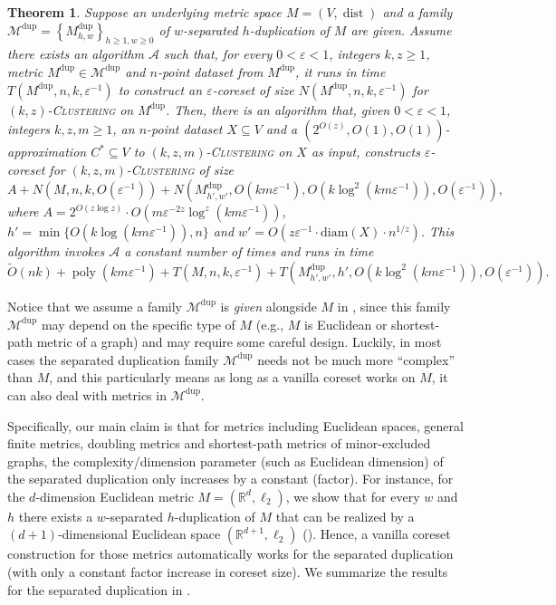 \documentclass[letterpaper,11pt]{article}
\theoremstyle{plain}
\newtheorem{theorem}{Theorem}[section]
\theoremstyle{definition}
\theoremstyle{remark}
\DeclareMathOperator{\poly}{poly}
\DeclareMathOperator{\dist}{dist}
\newcommand{\diam}{\mathrm{diam}}
\newcommand{\dup}{\mathrm{dup}}
\newcommand{\eps}{\varepsilon}
\newcommand{\calA}{\mathcal{A}}
\newcommand{\calM}{\mathcal{M}}
\newcommand{\ProblemName}[1]{\textsc{#1}}
\newcommand{\kzC}{\ProblemName{$(k,z)$-Clustering}\xspace}
\newcommand{\kzmC}{\ProblemName{$(k,z,m)$-Clustering}\xspace}
\begin{document}
\begin{theorem}
    \label{thm:reduction2}
    Suppose an underlying metric space $M=(V,\dist)$ and a family $\calM^\dup=\left\{M_{h,w}^\dup\right\}_{h\ge 1,w\ge 0}$ of $w$-separated $h$-duplication of $M$ are given. 
Assume there exists an algorithm $\calA$ such that, for every $0<\eps<1$, integers $k,z\ge 1$, metric $M^\dup\in\calM^\dup$ and  $n$-point dataset from $M^\dup$, it runs in time $T(M^\dup, n, k, \eps^{-1})$ to construct an $\eps$-coreset of size $N(M^\dup, n, k, \eps^{-1})$ for \kzC on $M^\dup$.
Then, there is an algorithm that, given $0<\eps<1$, integers $k,z,m\ge 1$, an $n$-point dataset $X\subseteq V$
    and a $(2^{O(z)},O(1),O(1))$-approximation $C^*\subseteq V$ to \kzmC on $X$ 
    as input, 
    constructs $\eps$-coreset for \kzmC of size 
    \begin{equation*}
        A + N(M,n,k,O(\eps^{-1})) + N\left(M^\dup_{h',w'}, O(km\eps^{-1}), O\left(k\log^2(km\eps^{-1})\right), O(\eps^{-1})\right),
    \end{equation*}
    where 
        $A = 2^{O(z\log z)}\cdot O\left(m \eps^{-2z} \log^z(km\eps^{-1})\right)$,
    $h' = \min\{O(k\log(km\eps^{-1})),n\}$ and $w' = O(z\eps^{-1}\cdot \diam(X)\cdot n^{1/z})$.
    This algorithm invokes $\calA$ a constant number of times and runs in time 
    \begin{equation*}
        \tilde O(nk) + \poly(km\eps^{-1}) + T(M,n,k,\eps^{-1}) + T\left(M^\dup_{h',w'}, h', O\left(k\log^2(k m\eps^{-1})\right),O(\eps^{-1})\right).
    \end{equation*}




\end{theorem}





Notice that we assume a family $\calM^\dup$ is \emph{given} alongside $M$ in ,
since this family $\calM^\dup$ may depend on the specific type of $M$ (e.g., $M$ is Euclidean or shortest-path metric of a graph)
and may require some careful design.
Luckily, in most cases the separated duplication family $\calM^\dup$ needs not be much more ``complex'' than $M$,
and this particularly means as long as a vanilla coreset works on $M$, it can also deal with metrics in $\calM^\dup$.

Specifically, our main claim is that for metrics including Euclidean spaces, general finite metrics, doubling metrics and shortest-path metrics of minor-excluded graphs,
the complexity/dimension parameter (such as Euclidean dimension) of the separated duplication
only increases by a constant (factor).
For instance, for the $d$-dimension Euclidean metric $M = (\mathbb{R}^d, \ell_2)$,
we show that for every $w$ and $h$ there exists a $w$-separated $h$-duplication of $M$ that can be realized by a
$(d + 1)$-dimensional Euclidean space $(\mathbb{R}^{d + 1}, \ell_2)$ ().
Hence, a vanilla coreset construction for those metrics automatically works for the separated duplication (with only a constant factor increase in coreset size).
We summarize the results for the separated duplication in .
\end{document}

